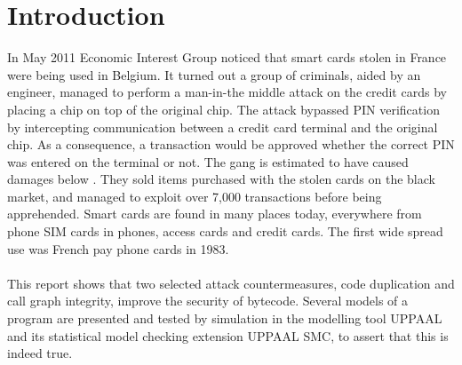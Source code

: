 \chapter{Introduction}
In May 2011 Economic Interest Group noticed that smart cards stolen in France were being used in Belgium\cite{fun}. It turned out a group of criminals, aided by an engineer, managed to perform a man-in-the middle attack on the credit cards by placing a chip on top of the original chip. The attack bypassed PIN verification by intercepting communication between a credit card terminal and the original chip. As a consequence, a transaction would be approved whether the correct PIN was entered on the terminal or not. The gang is estimated to have caused damages below . They sold items purchased with the stolen cards on the black market, and managed to exploit over 7,000 transactions before being apprehended. Smart cards are found in many places today, everywhere from phone SIM cards in phones, access cards and credit cards. The first wide spread use was French pay phone cards in 1983\cite[p. 366]{modbank}.\\\\
This report shows that two selected attack countermeasures, code duplication and call graph integrity, improve the security of \jc bytecode. Several models of a program are presented and tested by simulation in the modelling tool UPPAAL\cite{uppaal_site} and its statistical model checking extension UPPAAL SMC\cite{uppaal_smc_site}, to assert that this is indeed true.
